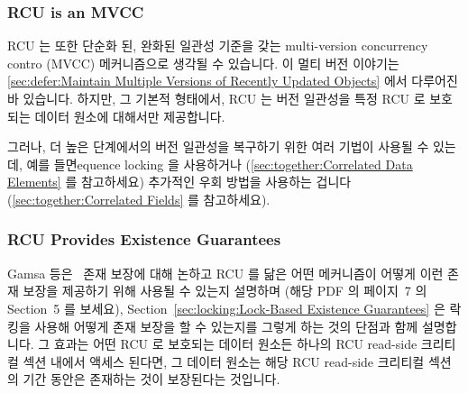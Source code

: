 \fi

\subsubsection{RCU is an MVCC}
\label{sec:defer:RCU is an MVCC}

RCU 는 또한 단순화 된, 완화된 일관성 기준을 갖는 multi-version concurrency
contro (MVCC) 메커니즘으로 생각될 수 있습니다.
이 멀티 버전 이야기는
\cref{sec:defer:Maintain Multiple Versions of Recently Updated Objects}
에서 다루어진 바 있습니다.
하지만, 그 기본적 형태에서, RCU 는 버전 일관성을 특정 RCU 로 보호되는 데이터
원소에 대해서만 제공합니다.

그러나, 더 높은 단계에서의 버전 일관성을 복구하기 위한 여러 기법이 사용될 수
있는데, 예를 들면equence locking 을 사용하거나
(\cref{sec:together:Correlated Data Elements} 를 참고하세요)
추가적인 우회 방법을 사용하는 겁니다
(\cref{sec:together:Correlated Fields} 를 참고하세요).

\subsubsection{RCU Provides Existence Guarantees}
\label{sec:defer:RCU Provides Existence Guarantees}

Gamsa 등은~\cite{Gamsa99} 존재 보장에 대해 논하고 RCU 를 닮은 어떤 메커니즘이
어떻게 이런 존재 보장을 제공하기 위해 사용될 수 있는지 설명하며 (해당 PDF 의
페이지~7 의 Section~5 를 보세요),
Section~\ref{sec:locking:Lock-Based Existence Guarantees}
은 락킹을 사용해 어떻게 존재 보장을 할 수 있는지를 그렇게 하는 것의 단점과 함께
설명합니다.
그 효과는 어떤 RCU 로 보호되는 데이터 원소든 하나의 RCU read-side 크리티컬 섹션
내에서 액세스 된다면, 그 데이터 원소는 해당 RCU read-side 크리티컬 섹션의 기간
동안은 존재하는 것이 보장된다는 것입니다.

